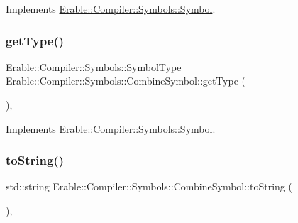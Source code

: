 Implements \mbox{\hyperlink{class_erable_1_1_compiler_1_1_symbols_1_1_symbol_ad9df550a90d6821b73291a241044c163}{Erable\+::\+Compiler\+::\+Symbols\+::\+Symbol}}.

\mbox{\label{struct_erable_1_1_compiler_1_1_symbols_1_1_combine_symbol_a416d89f88e2708deeaee33425849ae4a}} 
\subsubsection{\texorpdfstring{getType()}{getType()}}
{\footnotesize\ttfamily \mbox{\hyperlink{namespace_erable_1_1_compiler_1_1_symbols_a3b60ec10cda0920ec4368128361b8320}{Erable\+::\+Compiler\+::\+Symbols\+::\+Symbol\+Type}} Erable\+::\+Compiler\+::\+Symbols\+::\+Combine\+Symbol\+::get\+Type (\begin{DoxyParamCaption}{ }\end{DoxyParamCaption})\hspace{0.3cm}{\ttfamily [override]}, {\ttfamily [virtual]}}



Implements \mbox{\hyperlink{class_erable_1_1_compiler_1_1_symbols_1_1_symbol_a63b41d0942e5d65288fa3fc9d466ab43}{Erable\+::\+Compiler\+::\+Symbols\+::\+Symbol}}.

\mbox{\label{struct_erable_1_1_compiler_1_1_symbols_1_1_combine_symbol_aedd44bc23607d42bdb45a35aba3dd184}} 
\subsubsection{\texorpdfstring{toString()}{toString()}}
{\footnotesize\ttfamily std\+::string Erable\+::\+Compiler\+::\+Symbols\+::\+Combine\+Symbol\+::to\+String (\begin{DoxyParamCaption}{ }\end{DoxyParamCaption})\hspace{0.3cm}{\ttfamily [override]}, {\ttfamily [virtual]}}



